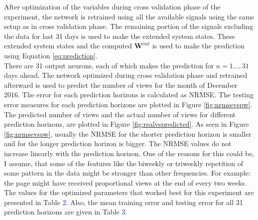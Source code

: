 
\indent \indent
After optimization of the variables during cross validation phase of the experiment, the network is retrained using all the available signals using the same setup as in cross validation phase.  The remaining portion of the signals excluding the data for last 31 days is used to make the extended system states. These extended system states and the computed $\mathbf{W}^{out}$ is used to make the prediction using Equation \eqref{eq:prediction}. \\
There are 31 output neurons, each of which makes the prediction for $n=1\hdots,31$ days ahead. The network optimized during cross validation phase and retrained afterward is used to predict the number of views for the month of December 2016. The error for each prediction horizons is calculated as NRMSE. The testing error measures for each prediction horizons are plotted in Figure \ref{fig:nrmsevspw}. The predicted number of views and the actual number of views for different prediction horizons, are plotted in Figure \ref{fig:realvspredicted}. As seen in Figure \ref{fig:nrmsevspw}, usually the NRMSE for the shorter prediction horizon is smaller and for the longer prediction horizon is bigger. The NRMSE values do not increase linearly with the prediction horizon. One of the reasons for this could be, I assume, that some of the features like the biweekly or triweekly repetition of some pattern in the data might be stronger than other frequencies. For example: the page might have received proportional views at the end of every two weeks.
\\
The values for the optimized parameters that worked best for this experiment are presented in Table \textcolor{blue}{2}. Also, the mean training error and testing error for all 31 prediction horizons are given in Table \textcolor{blue}{3}.\\



